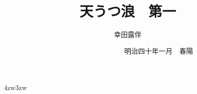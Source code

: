 \documentclass[dvipdfmx,uplatex,tate,book,paper=a5paper,jafontsize=13pt,
    open_bracket_pos=nibu_tentsuki,hanging_punctuation]{jlreq}
\title{\Huge 天うつ浪　{\Large 第一}}
\author{幸田露伴}
\date{　　　　　　　　　{\small 明治四十年一月}　春陽{\換字{堂}}}
\newcommand{\詰めruby}[2]{\ruby[g]{#1}{{\kanjiskip=0pt plus 0pt minus 0pt #2}}}
\newcommand{\原本頁}[1]{}
\begin{document}
\maketitle
\pagestyle{myheadings}
\newcommand{\Entry}[1]{
	\section*{#1}
	\markboth{#1}{#1}
	\setcounter{equation}{0}}
\begin{indentation}{4zw}{3zw}
\parindent=0pt

\newpage
\　%
\newpage










































\end{indentation}
\end{document}
